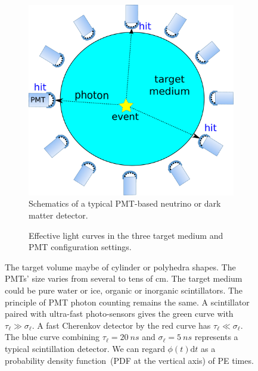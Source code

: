 \begin{figure}[!ht]
  \begin{subfigure}{0.44\textwidth}
  \includegraphics[width=\linewidth]{figures/detector.pdf}
  \caption{\label{fig:detector} Schematics of a typical PMT-based neutrino or dark matter detector.}
\end{subfigure}
\hfill
\begin{subfigure}{0.54\textwidth}
  \resizebox{\linewidth}{!}{}
  \caption{\label{fig:time-pro} Effective light curves in the three target medium and PMT configuration settings.}
\end{subfigure}
  \caption{ The target volume maybe of cylinder or polyhedra shapes.  The PMTs' size varies from several to tens of \si{cm}.  The target medium could be pure water or ice, organic or inorganic scintillators. The principle of PMT photon counting remains the same.  A scintillator paired with ultra-fast photo-sensors gives the green curve with $\tau_\ell \gg \sigma_\ell$.  A fast Cherenkov detector by the red curve has $\tau_\ell \ll \sigma_\ell$.  The blue curve combining $\tau_\ell=\SI{20}{ns}$ and $\sigma_\ell=\SI{5}{ns}$ represents a typical scintillation detector.  We can regard $\phi(t)\mathrm{d}t$ as a probability density function~(PDF at the vertical axis) of PE times.}

\end{figure}

